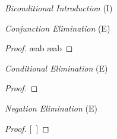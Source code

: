 \begin{multicols}{2}
\textit{Biconditional Introduction} (\eiff I) \vspace{-1em}

\begin{fitchproof}
	\open
		 
	\close
\breakline
	\open
		 
	\close
\end{fitchproof}

\iffalse %
\begin{proof}
	\have[m]{ab}{\metaA{}\eif\metaB{}}
	\have[n]{ba}{\metaB{}\eif\metaA{}}
	\have[\ ]{c}{\metaA{}\eiff\metaB{}} \bi{ab, ba}
\end{proof}
\fi 

\vfill\null
\columnbreak


\textit{Conjunction Elimination} (\eand E) \vspace{-1em}

\begin{proof}
	 \ae{ab}
	 \ae{ab}
\end{proof}

\vspace{0.75em}

\textit{Conditional Elimination} (\eif E)  \vspace{-1em}

\begin{proof}
	 
\end{proof}

\vspace{0.45em}

\textit{Negation Elimination} (\enot E)  \vspace{-1em}

\begin{proof}
\open
	 
	\ellipsesline
	\metaB{}
\close
{}[\ ]\metaA{}
\end{proof}


\end{multicols}
